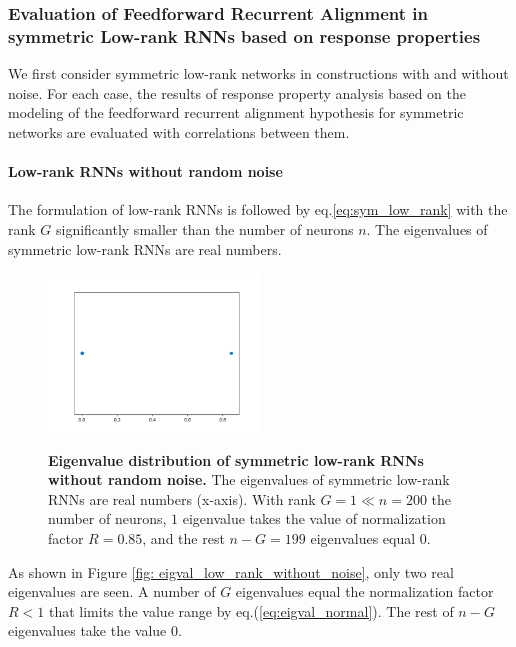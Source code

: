 \documentclass[11pt]{article}
\begin{document}
	\subsubsection{Evaluation of Feedforward Recurrent Alignment in symmetric Low-rank RNNs based on response properties}
	We first consider symmetric low-rank networks in constructions with and without noise. For each case, the results of response property analysis based on the modeling of the feedforward recurrent alignment hypothesis for symmetric networks are evaluated with correlations between them. 
	
	\paragraph{Low-rank RNNs without random noise}
	The formulation of low-rank RNNs is followed by eq.\ref{eq:sym_low_rank} with the rank $G$ significantly smaller than the number of neurons $n$. The eigenvalues of symmetric low-rank RNNs are real numbers. 
		\begin{figure} 
			\centering 
			\caption{\textbf{Eigenvalue distribution of symmetric low-rank RNNs without random noise.} The eigenvalues of symmetric low-rank RNNs are real numbers (x-axis). With rank $G = 1 \ll n = 200$ the number of neurons, $1$ eigenvalue takes the value of normalization factor $R = 0.85$, and the rest $n-G = 199$ eigenvalues equal $0$. }
			\includegraphics[width=0.5\textwidth]{../figures/eigval_low_rank_sym_no_noise.png}
			\label{fig:eigval_low_rank_without_noise}
		\end{figure}
	
	As shown in Figure \ref{fig: eigval_low_rank_without_noise}, only two real eigenvalues are seen. A number of $G$ eigenvalues equal the normalization factor $R < 1$ that limits the value range by eq.(\ref{eq:eigval_normal}). The rest of $n-G$ eigenvalues take the value $0$. 
	
\end{document}
